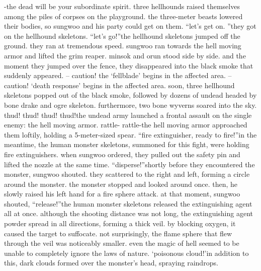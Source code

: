 -the dead will be your subordinate spirit.
three hellhounds raised themselves among the piles of corpses on the playground.
the three-meter beasts lowered their bodies, so sungwoo and his party could get on them.
“let’s get on.
”they got on the hellhound skeletons.
“let’s go!”the hellhound skeletons jumped off the ground.
 they ran at tremendous speed.
 sungwoo ran towards the hell moving armor and lifted the grim reaper.
 minsok and orun stood side by side.
and the moment they jumped over the fence, they disappeared into the black smoke that suddenly appeared.
– caution! the ‘fellblade’ begins in the affected area.
– caution! ‘death response’ begins in the affected area.
soon, three hellhound skeletons popped out of the black smoke, followed by dozens of undead headed by bone drake and ogre skeleton.
 furthermore, two bone wyverns soared into the sky.
thud! thud! thud! thud!the undead army launched a frontal assault on the single enemy: the hell moving armor.
rattle- rattle-the hell moving armor approached them loftily, holding a 5-meter-sized spear.
“fire extinguisher, ready to fire!”in the meantime, the human monster skeletons, summoned for this fight, were holding fire extinguishers.
 when sungwoo ordered, they pulled out the safety pin and lifted the nozzle at the same time.
“disperse!”shortly before they encountered the monster, sungwoo shouted.
 they scattered to the right and left, forming a circle around the monster.
the monster stopped and looked around once.
 then, he slowly raised his left hand for a fire sphere attack.
at that moment, sungwoo shouted, “release!”the human monster skeletons released the extinguishing agent all at once.
 although the shooting distance was not long, the extinguishing agent powder spread in all directions, forming a thick veil.
 by blocking oxygen, it caused the target to suffocate.
not surprisingly, the flame sphere that flew through the veil was noticeably smaller.
even the magic of hell seemed to be unable to completely ignore the laws of nature.
‘poisonous cloud!’in addition to this, dark clouds formed over the monster’s head, spraying raindrops.

